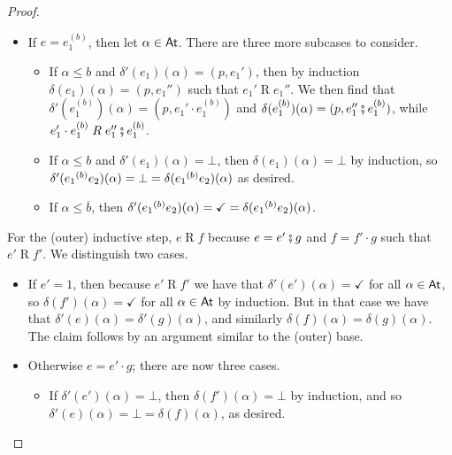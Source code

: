 \documentclass[orivec,envcountsect,envcountsame]{llncs}
\begin{document}
\begin{proof}
\begin{itemize}
\begin{itemize}
			\item
			If $\delta'(e_1)(\alpha) = \checkmark$, then $\delta(e_1)(\alpha) = \checkmark$, so $\delta'(e_1 \cdot e_2)(\alpha) = \delta'(e_2)(\alpha)$ and $\delta(e_1 \cdot e_2)(\alpha) = \delta(e_1)(\alpha)$; the claim then follows by induction.
		\end{itemize}

		\item
		If $e = e_1^{(b)}$, then let $\alpha \in \mathsf{At}$.
		There are three more subcases to consider.
		\begin{itemize}
			\item
			If $\alpha \leq b$ and $\delta'(e_1)(\alpha) = (p, e_1')$, then by induction $\delta(e_1)(\alpha) = (p, e_1'')$ such that $e_1' \mathrel{R} e_1''$.
			We then find that $\delta'(e_1^{(b)})(\alpha) = (p, e_1' \cdot e_1^{(b)})$ and $\delta(e_1^{(b)})(\alpha) = (p, e_1'' \fatsemi e_1^{(b)})$, while $e_1' \cdot e_1^{(b)} \mathrel{R} e_1'' \fatsemi e_1^{(b)}$.
            \item
            If $\alpha \leq b$ and $\delta'(e_1)(\alpha) = \bot$, then $\delta(e_1)(\alpha) = \bot$ by induction, so $\delta'(e_1 {\mathbin{^{(b)}}} e_2)(\alpha) = \bot = \delta(e_1 {\mathbin{^{(b)}}} e_2)(\alpha)$ as desired.
            \item
            If $\alpha \leq \overline{b}$, then $\delta'(e_1 {\mathbin{^{(b)}}} e_2)(\alpha) = \checkmark = \delta(e_1 {\mathbin{^{(b)}}} e_2)(\alpha)$.
		\end{itemize}
	\end{itemize}
	For the (outer) inductive step, $e \mathrel{R} f$ because $e = e' \fatsemi g$ and $f = f' \cdot g$ such that $e' \mathrel{R} f'$.
	We distinguish two cases.
	\begin{itemize}
		\item
		If $e' = 1$, then because $e' \mathrel{R} f'$ we have that $\delta'(e')(\alpha) = \checkmark$ for all $\alpha \in \mathsf{At}$, so $\delta(f')(\alpha) = \checkmark$ for all $\alpha \in \mathsf{At}$ by induction.
		But in that case we have that $\delta'(e)(\alpha) = \delta'(g)(\alpha)$, and similarly $\delta(f)(\alpha) = \delta(g)(\alpha)$.
		The claim follows by an argument similar to the (outer) base.

		\item
		Otherwise $e = e' \cdot g$; there are now three cases.
		\begin{itemize}
			\item
			If $\delta'(e')(\alpha) = \bot$, then $\delta(f')(\alpha) = \bot$ by induction, and so $\delta'(e)(\alpha) = \bot = \delta(f)(\alpha)$, as desired.


\end{itemize}
\end{itemize}
\end{proof}
\end{document}
